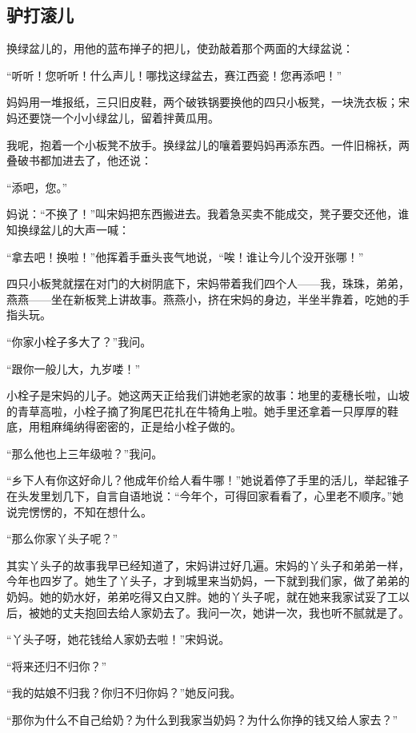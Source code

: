 \subsection{驴打滚儿}


\par 换绿盆儿的，用他的蓝布掸子的把儿，使劲敲着那个两面的大绿盆说：
\par “听听！您听听！什么声儿！哪找这绿盆去，赛江西瓷！您再添吧！”
\par 妈妈用一堆报纸，三只旧皮鞋，两个破铁锅要换他的四只小板凳，一块洗衣板；宋妈还要饶一个小小绿盆儿，留着拌黄瓜用。
\par 我呢，抱着一个小板凳不放手。换绿盆儿的嚷着要妈妈再添东西。一件旧棉袄，两叠破书都加进去了，他还说：
\par “添吧，您。”
\par 妈说：“不换了！”叫宋妈把东西搬进去。我着急买卖不能成交，凳子要交还他，谁知换绿盆儿的大声一喊：
\par “拿去吧！换啦！”他挥着手垂头丧气地说，“唉！谁让今儿个没开张哪！”
\par 四只小板凳就摆在对门的大树阴底下，宋妈带着我们四个人——我，珠珠，弟弟，燕燕——坐在新板凳上讲故事。燕燕小，挤在宋妈的身边，半坐半靠着，吃她的手指头玩。
\par “你家小栓子多大了？”我问。
\par “跟你一般儿大，九岁喽！”
\par 小栓子是宋妈的儿子。她这两天正给我们讲她老家的故事：地里的麦穗长啦，山坡的青草高啦，小栓子摘了狗尾巴花扎在牛犄角上啦。她手里还拿着一只厚厚的鞋底，用粗麻绳纳得密密的，正是给小栓子做的。
\par “那么他也上三年级啦？”我问。
\par “乡下人有你这好命儿？他成年价给人看牛哪！”她说着停了手里的活儿，举起锥子在头发里划几下，自言自语地说：“今年个，可得回家看看了，心里老不顺序。”她说完愣愣的，不知在想什么。
\par “那么你家丫头子呢？”
\par 其实丫头子的故事我早已经知道了，宋妈讲过好几遍。宋妈的丫头子和弟弟一样，今年也四岁了。她生了丫头子，才到城里来当奶妈，一下就到我们家，做了弟弟的奶妈。她的奶水好，弟弟吃得又白又胖。她的丫头子呢，就在她来我家试妥了工以后，被她的丈夫抱回去给人家奶去了。我问一次，她讲一次，我也听不腻就是了。
\par “丫头子呀，她花钱给人家奶去啦！”宋妈说。
\par “将来还归不归你？”
\par “我的姑娘不归我？你归不归你妈？”她反问我。
\par “那你为什么不自己给奶？为什么到我家当奶妈？为什么你挣的钱又给人家去？”
